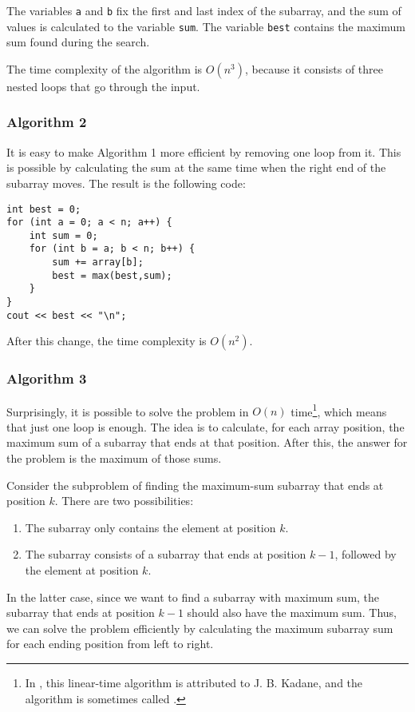 The variables \texttt{a} and \texttt{b} fix the first and
last index of the subarray,
and the sum of values is calculated to the variable \texttt{sum}.
The variable \texttt{best} contains the maximum sum found during the search.

The time complexity of the algorithm is $O(n^3)$,
because it consists of three nested loops 
that go through the input.

\subsubsection{Algorithm 2}

It is easy to make Algorithm 1 more efficient
by removing one loop from it.
This is possible by calculating the sum at the same
time when the right end of the subarray moves.
The result is the following code:

\begin{lstlisting}
int best = 0;
for (int a = 0; a < n; a++) {
    int sum = 0;
    for (int b = a; b < n; b++) {
        sum += array[b];
        best = max(best,sum);
    }
}
cout << best << "\n";
\end{lstlisting}
After this change, the time complexity is $O(n^2)$.

\subsubsection{Algorithm 3}

Surprisingly, it is possible to solve the problem
in $O(n)$ time\footnote{In \cite{ben86}, this linear-time algorithm
is attributed to J. B. Kadane, and the algorithm is sometimes
called  .}, which means
that just one loop is enough.
The idea is to calculate, for each array position,
the maximum sum of a subarray that ends at that position.
After this, the answer for the problem is the
maximum of those sums.

Consider the subproblem of finding the maximum-sum subarray
that ends at position $k$.
There are two possibilities:
\begin{enumerate}
\item The subarray only contains the element at position $k$.
\item The subarray consists of a subarray that ends
at position $k-1$, followed by the element at position $k$.
\end{enumerate}

In the latter case, since we want to
find a subarray with maximum sum,
the subarray that ends at position $k-1$
should also have the maximum sum.
Thus, we can solve the problem efficiently
by calculating the maximum subarray sum
for each ending position from left to right.

